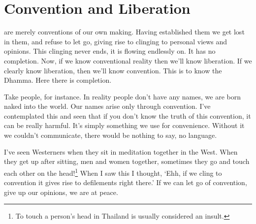
\renewcommand{\chapterFootnotemark}{\footnotemark}
\renewcommand{\chapterFootnotetext}{\footnotetext{\textit{Note}: A different translation of this talk has been published elsewhere under the title: `\textit{Suppositions and Release}' by Ajahn Thanissaro.}}

\chapter{Convention and Liberation}

 are merely conventions of our own making. Having established them we get lost in them, and refuse to let go, giving rise to clinging to personal views and opinions. This clinging never ends, it is  flowing endlessly on. It has no completion. Now, if we know conventional reality then we'll know liberation. If we clearly know liberation, then we'll know convention. This is to know the Dhamma. Here there is completion. 

Take people, for instance. In reality people don't have any names, we are born naked into the world. Our names arise only through convention. I've contemplated this and seen that if you don't know the truth of this convention, it can be really harmful. It's simply something we use for convenience. Without it we couldn't communicate, there would be nothing to say, no language. 

I've seen Westerners when they sit in meditation together in the West. When they get up after sitting, men and women together, sometimes they go and touch each other on the head!\footnote{To touch a person's head in Thailand is usually considered an insult. } When I saw this I thought, `Ehh, if we cling to convention it gives rise to defilements right there.' If we can let go of convention, give up our opinions, we are at peace. 

